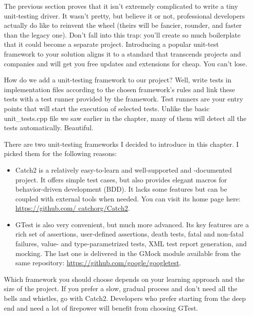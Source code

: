 
The previous section proves that it isn't extremely complicated to write a tiny unit-testing driver. It wasn't pretty, but believe it or not, professional developers actually do like to reinvent the wheel (theirs will be fancier, rounder, and faster than the legacy one). Don't fall into this trap: you'll create so much boilerplate that it could become a separate project. Introducing a popular unit-test framework to your solution aligns it to a standard that transcends projects and companies and will get you free updates and extensions for cheap. You can't lose.

How do we add a unit-testing framework to our project? Well, write tests in implementation files according to the chosen framework's rules and link these tests with a test runner provided by the framework. Test runners are your entry points that will start the execution of selected tests. Unlike the basic unit\_tests.cpp file we saw earlier in the chapter, many of them will detect all the tests automatically. Beautiful.

There are two unit-testing frameworks I decided to introduce in this chapter. I picked them for the following reasons:

\begin{itemize}
\item 
Catch2 is a relatively easy-to-learn and well-supported and -documented project. It offers simple test cases, but also provides elegant macros for behavior-driven development (BDD). It lacks some features but can be coupled with external tools when needed. You can visit its home page here: \url{https://github.com/ catchorg/Catch2}.

\item 
GTest is also very convenient, but much more advanced. Its key features are a rich set of assertions, user-defined assertions, death tests, fatal and non-fatal failures, value- and type-parametrized tests, XML test report generation, and mocking. The last one is delivered in the GMock module available from the same repository: \url{https://github.com/google/googletest}.
\end{itemize}

Which framework you should choose depends on your learning approach and the size of the project. If you prefer a slow, gradual process and don't need all the bells and whistles, go with Catch2. Developers who prefer starting from the deep end and need a lot of firepower will benefit from choosing GTest.


